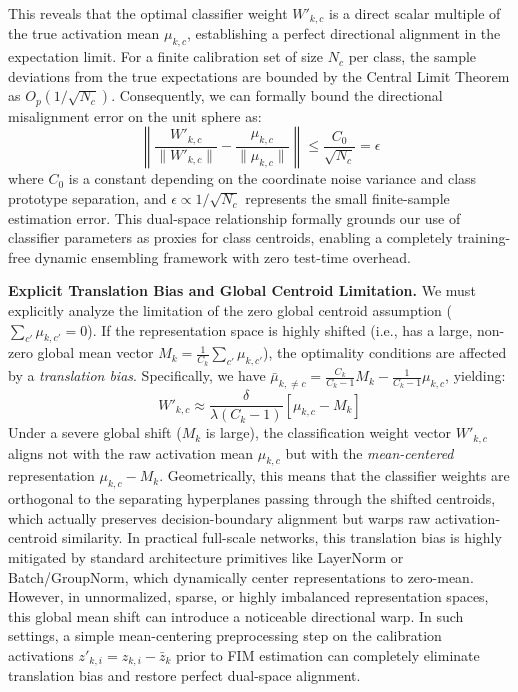 This reveals that the optimal classifier weight $W'_{k, c}$ is a direct scalar multiple of the true activation mean $\mu_{k, c}$, establishing a perfect directional alignment in the expectation limit. For a finite calibration set of size $N_c$ per class, the sample deviations from the true expectations are bounded by the Central Limit Theorem as $O_p(1/\sqrt{N_c})$. Consequently, we can formally bound the directional misalignment error on the unit sphere as:
\begin{equation}
\left\| \frac{W'_{k, c}}{\|W'_{k, c}\|} - \frac{\mu_{k, c}}{\|\mu_{k, c}\|} \right\| \le \frac{C_0}{\sqrt{N_c}} = \epsilon
\end{equation}
where $C_0$ is a constant depending on the coordinate noise variance and class prototype separation, and $\epsilon \propto 1/\sqrt{N_c}$ represents the small finite-sample estimation error. This dual-space relationship formally grounds our use of classifier parameters as proxies for class centroids, enabling a completely training-free dynamic ensembling framework with zero test-time overhead.

\textbf{Explicit Translation Bias and Global Centroid Limitation.} We must explicitly analyze the limitation of the zero global centroid assumption ($\sum_{c'} \mu_{k, c'} = 0$). If the representation space is highly shifted (i.e., has a large, non-zero global mean vector $M_k = \frac{1}{C_k}\sum_{c'} \mu_{k, c'}$), the optimality conditions are affected by a \emph{translation bias}. Specifically, we have $\bar{\mu}_{k, \ne c} = \frac{C_k}{C_k - 1}M_k - \frac{1}{C_k - 1}\mu_{k, c}$, yielding:
\begin{equation}
W'_{k, c} \approx \frac{\delta}{\lambda (C_k - 1)} \left[ \mu_{k, c} - M_k \right]
\end{equation}
Under a severe global shift ($M_k$ is large), the classification weight vector $W'_{k, c}$ aligns not with the raw activation mean $\mu_{k, c}$ but with the \emph{mean-centered} representation $\mu_{k, c} - M_k$. Geometrically, this means that the classifier weights are orthogonal to the separating hyperplanes passing through the shifted centroids, which actually preserves decision-boundary alignment but warps raw activation-centroid similarity. 
In practical full-scale networks, this translation bias is highly mitigated by standard architecture primitives like LayerNorm or Batch/GroupNorm, which dynamically center representations to zero-mean. However, in unnormalized, sparse, or highly imbalanced representation spaces, this global mean shift can introduce a noticeable directional warp. In such settings, a simple mean-centering preprocessing step on the calibration activations $z'_{k, i} = z_{k, i} - \bar{z}_{k}$ prior to FIM estimation can completely eliminate translation bias and restore perfect dual-space alignment.

